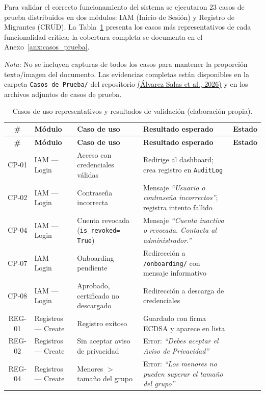 \documentclass[10pt,letterpaper]{report}
\newcommand{\citeref}[2]{\hyperlink{ref:#1}{(#2)}}
\newcommand{\cmark}{\ding{51}}   %
\begin{document}
Para validar el correcto funcionamiento del sistema se ejecutaron 23 casos de prueba distribuidos en dos módulos: IAM (Inicio de Sesión) y Registro de Migrantes (CRUD). La Tabla~\ref{tab:validaciones_resumen} presenta los casos más representativos de cada funcionalidad crítica; la cobertura completa se documenta en el Anexo~\ref{anx:casos_prueba}.

\textit{Nota:} No se incluyen capturas de todos los casos para mantener la proporción texto/imagen del documento. Las evidencias completas están disponibles en la carpeta \texttt{Casos de Prueba/} del repositorio \citeref{repo2026}{Álvarez Salas et al., 2026} y en los archivos adjuntos de casos de prueba.

\begin{longtable}{c p{2.0cm} p{3.2cm} p{3.2cm} c}
\caption{Casos de uso representativos y resultados de validación (elaboración propia).}
\label{tab:validaciones_resumen}\\
\toprule
\textbf{\#} & \textbf{Módulo} & \textbf{Caso de uso} & \textbf{Resultado esperado} & \textbf{Estado}\\
\midrule
\endfirsthead
\toprule
\textbf{\#} & \textbf{Módulo} & \textbf{Caso de uso} & \textbf{Resultado esperado} & \textbf{Estado}\\
\midrule
\endhead
\bottomrule
\endfoot
CP-01 & IAM --- Login & Acceso con credenciales válidas & Redirige al dashboard; crea registro en \texttt{AuditLog} & \cmark \\[4pt]
CP-02 & IAM --- Login & Contraseña incorrecta & Mensaje \textit{``Usuario o contraseña incorrectos''}; registra intento fallido & \cmark \\[4pt]
CP-04 & IAM --- Login & Cuenta revocada (\texttt{is\_revoked= True}) & Mensaje \textit{``Cuenta inactiva o revocada. Contacta al administrador.''} & \cmark \\[4pt]
CP-07 & IAM --- Login & Onboarding pendiente & Redirección a \texttt{/onboarding/} con mensaje informativo & \cmark \\[4pt]
CP-08 & IAM --- Login & Aprobado, certificado no descargado & Redirección a descarga de credenciales & \cmark \\[4pt]
REG-01 & Registros --- Create & Registro exitoso & Guardado con firma ECDSA y aparece en lista & \cmark \\[4pt]
REG-02 & Registros --- Create & Sin aceptar aviso de privacidad & Error: \textit{``Debes aceptar el Aviso de Privacidad''} & \cmark \\[4pt]
REG-04 & Registros --- Create & Menores $>$ tamaño del grupo & Error: \textit{``Los menores no pueden superar el tamaño del grupo''} & \cmark \\[4pt]

\end{longtable}
\end{document}
